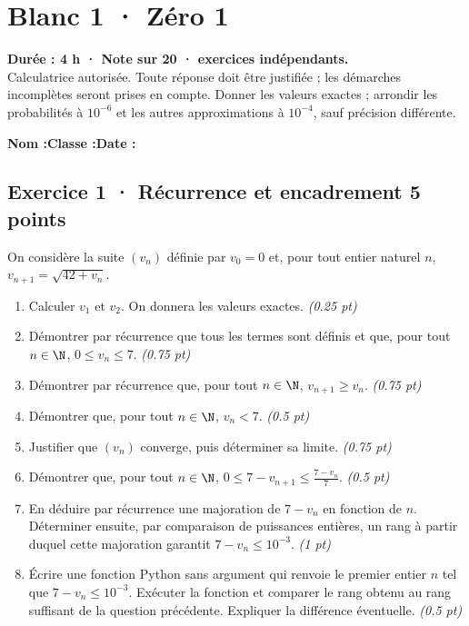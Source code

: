 \mxnewpage{}\label{sujet:5-1}

\section*{Blanc 1 · Zéro 1}


\textbf{Durée : 4 h · Note sur 20 ·  exercices indépendants.}\\Calculatrice autorisée. Toute réponse doit être justifiée ; les démarches incomplètes seront prises en compte. Donner les valeurs exactes ; arrondir les probabilités à $10^{-6}$ et les autres approximations à $10^{-4}$, sauf précision différente.

\smallskip\textbf{Nom :}\enspace\dotfill\quad\textbf{Classe :}\enspace\dotfill\quad\textbf{Date :}\enspace\dotfill

\subsection*{Exercice 1 · Récurrence et encadrement \hfill 5 points}On considère la suite $(v_n)$ définie par $v_0=0$ et, pour tout entier naturel $n$, $v_{n+1}=\sqrt{42+v_n}$.

\begin{enumerate}

\item Calculer $v_1$ et $v_2$. On donnera les valeurs exactes. \hfill\textit{(\num{0,25} pt)}

\item Démontrer par récurrence que tous les termes sont définis et que, pour tout $n\in\N$, $0\le v_n\le7$. \hfill\textit{(\num{0,75} pt)}

\item Démontrer par récurrence que, pour tout $n\in\N$, $v_{n+1}\ge v_n$. \hfill\textit{(\num{0,75} pt)}

\item Démontrer que, pour tout $n\in\N$, $v_n<7$. \hfill\textit{(\num{0,5} pt)}

\item Justifier que $(v_n)$ converge, puis déterminer sa limite. \hfill\textit{(\num{0,75} pt)}

\item Démontrer que, pour tout $n\in\N$, $0\le 7-v_{n+1}\le\frac{7-v_n}{7}$. \hfill\textit{(\num{0,5} pt)}

\item En déduire par récurrence une majoration de $7-v_n$ en fonction de $n$. Déterminer ensuite, par comparaison de puissances entières, un rang à partir duquel cette majoration garantit $7-v_n\le10^{-3}$. \hfill\textit{(1 pt)}

\item Écrire une fonction Python sans argument qui renvoie le premier entier $n$ tel que $7-v_n\le10^{-3}$. Exécuter la fonction et comparer le rang obtenu au rang suffisant de la question précédente. Expliquer la différence éventuelle. \hfill\textit{(\num{0,5} pt)}

\end{enumerate}

